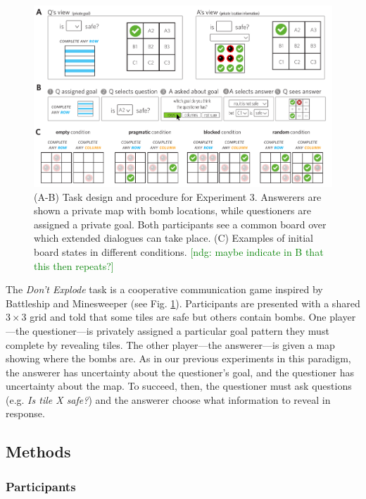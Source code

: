 \documentclass[11pt, floatsintext]{apa6}
\newcommand{\ndg}[1]{\textcolor{Green}{[ndg: #1]}}
\begin{document}
\begin{figure}[tbh!]
\begin{center}
\includegraphics[scale = .7]{Exp3/spatialDemo.pdf}
\end{center}
\caption{(A-B) Task design and procedure for Experiment 3. Answerers are shown a private map with bomb locations, while questioners are assigned a private goal. Both participants see a common board over which extended dialogues can take place. (C) Examples of initial board states in different conditions. \ndg{maybe indicate in B that this then repeats?}}
\label{fig:exp3task}
\end{figure}

The \emph{Don't Explode} task is a cooperative communication game inspired by Battleship and Minesweeper (see Fig. \ref{fig:exp3task}). 
Participants are presented with a shared $3 \times 3$ grid and told that some tiles are safe but others contain bombs.
One player---the questioner---is privately assigned a particular goal pattern they must complete by revealing tiles.
The other player---the answerer---is given a map showing where the bombs are.
As in our previous experiments in this paradigm, the answerer has uncertainty about the questioner's goal, and the questioner has uncertainty about the map.
To succeed, then, the questioner must ask questions (e.g. \emph{Is tile X safe?}) and the answerer choose what information to reveal in response.

\subsection{Methods}

\subsubsection{Participants}
\end{document}
